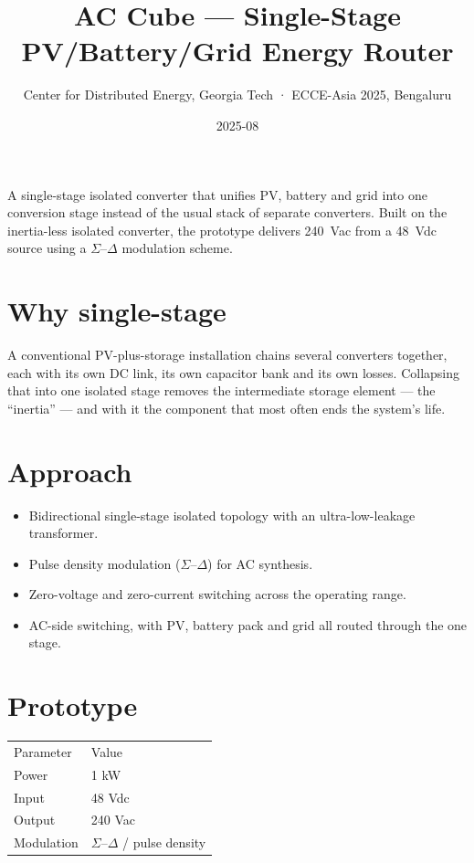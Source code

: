 \title{AC Cube --- Single-Stage PV/Battery/Grid Energy Router}
\subtitle{Center for Distributed Energy, Georgia Tech · ECCE-Asia 2025, Bengaluru}
\date{2025-08}





A single-stage isolated converter that unifies PV, battery and grid into one
conversion stage instead of the usual stack of separate converters. Built on the
inertia-less isolated converter, the prototype delivers 240~Vac from a 48~Vdc
source using a $\Sigma$--$\Delta$ modulation scheme.

\section{Why single-stage}

A conventional PV-plus-storage installation chains several converters together,
each with its own DC link, its own capacitor bank and its own losses. Collapsing
that into one isolated stage removes the intermediate storage element --- the
``inertia'' --- and with it the component that most often ends the system's
life.

\section{Approach}

\begin{itemize}
  \item Bidirectional single-stage isolated topology with an ultra-low-leakage
        transformer.
  \item Pulse density modulation ($\Sigma$--$\Delta$) for AC synthesis.
  \item Zero-voltage and zero-current switching across the operating range.
  \item AC-side switching, with PV, battery pack and grid all routed through the
        one stage.
\end{itemize}

\section{Prototype}

\begin{tabular}{ll}
  Parameter & Value \\
  Power & 1 kW \\
  Input & 48 Vdc \\
  Output & 240 Vac \\
  Modulation & $\Sigma$--$\Delta$ / pulse density \\
\end{tabular}


